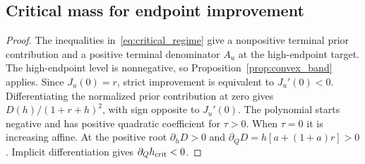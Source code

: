 \subsection{Critical mass for endpoint improvement}
\begin{proof}
The inequalities in~\eqref{eq:critical_regime} give a nonpositive
terminal prior contribution and a positive terminal denominator $A_u$
at the high-endpoint target. The high-endpoint level is nonnegative, so
Proposition~\ref{prop:convex_band} applies. Since $J_u(0)=r$,
strict improvement is equivalent to $J_u'(0)<0$. Differentiating
the normalized prior contribution at zero gives
$D(h)/(1+r+h)^2$, with sign opposite to $J_u'(0)$.
The polynomial starts negative and has positive quadratic
coefficient for $\tau>0$. When $\tau=0$ it is increasing affine.
At the positive root $\partial_hD>0$ and
$\partial_Q D=h[a+(1+a)r]>0$. Implicit differentiation gives
$\partial_Q h_{\rm crit}<0$.
\end{proof}
